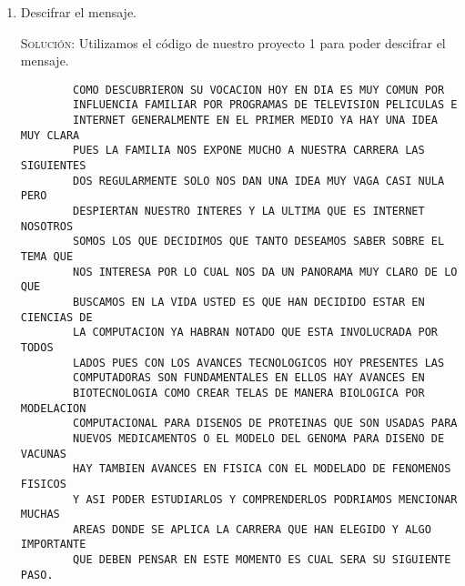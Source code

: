 \documentclass[letterpaper,11pt]{article}
\begin{document}
\begin{enumerate}
\begin{enumerate}
        \item Descifrar el mensaje.
        
        \textsc{Solución:} Utilizamos el código de nuestro proyecto 1 para
        poder descifrar el mensaje. 
        \begin{verbatim}
        COMO DESCUBRIERON SU VOCACION HOY EN DIA ES MUY COMUN POR 
        INFLUENCIA FAMILIAR POR PROGRAMAS DE TELEVISION PELICULAS E 
        INTERNET GENERALMENTE EN EL PRIMER MEDIO YA HAY UNA IDEA MUY CLARA 
        PUES LA FAMILIA NOS EXPONE MUCHO A NUESTRA CARRERA LAS SIGUIENTES 
        DOS REGULARMENTE SOLO NOS DAN UNA IDEA MUY VAGA CASI NULA PERO    
        DESPIERTAN NUESTRO INTERES Y LA ULTIMA QUE ES INTERNET NOSOTROS 
        SOMOS LOS QUE DECIDIMOS QUE TANTO DESEAMOS SABER SOBRE EL TEMA QUE 
        NOS INTERESA POR LO CUAL NOS DA UN PANORAMA MUY CLARO DE LO QUE       
        BUSCAMOS EN LA VIDA USTED ES QUE HAN DECIDIDO ESTAR EN CIENCIAS DE 
        LA COMPUTACION YA HABRAN NOTADO QUE ESTA INVOLUCRADA POR TODOS 
        LADOS PUES CON LOS AVANCES TECNOLOGICOS HOY PRESENTES LAS 
        COMPUTADORAS SON FUNDAMENTALES EN ELLOS HAY AVANCES EN 
        BIOTECNOLOGIA COMO CREAR TELAS DE MANERA BIOLOGICA POR MODELACION 
        COMPUTACIONAL PARA DISENOS DE PROTEINAS QUE SON USADAS PARA 
        NUEVOS MEDICAMENTOS O EL MODELO DEL GENOMA PARA DISENO DE VACUNAS 
        HAY TAMBIEN AVANCES EN FISICA CON EL MODELADO DE FENOMENOS FISICOS 
        Y ASI PODER ESTUDIARLOS Y COMPRENDERLOS PODRIAMOS MENCIONAR MUCHAS 
        AREAS DONDE SE APLICA LA CARRERA QUE HAN ELEGIDO Y ALGO IMPORTANTE 
        QUE DEBEN PENSAR EN ESTE MOMENTO ES CUAL SERA SU SIGUIENTE PASO.
        \end{verbatim}
    \end{enumerate}
\end{enumerate}
\end{document}
